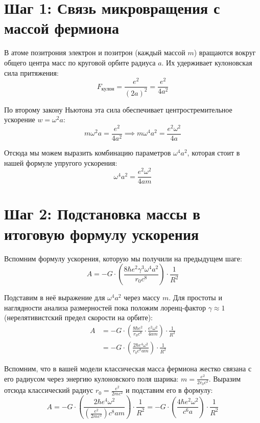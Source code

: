 \documentclass[12pt,a4paper]{article}
\begin{document}
\section*{Шаг 1: Связь микровращения с массой фермиона}

В атоме позитрония электрон и позитрон (каждый массой $m$) вращаются вокруг общего центра масс по круговой орбите радиуса $a$. Их удерживает кулоновская сила притяжения:
\begin{equation}
F_{кулон} = \frac{e^2}{(2a)^2} = \frac{e^2}{4a^2}
\end{equation}

По второму закону Ньютона эта сила обеспечивает центростремительное ускорение $w = \omega^2 a$:
\begin{equation}
m \omega^2 a = \frac{e^2}{4a^2} \implies m \omega^4 a^2 = \frac{e^2 \omega^2}{4a}
\end{equation}

Отсюда мы можем выразить комбинацию параметров $\omega^4 a^2$, которая стоит в нашей формуле упругого ускорения:
\begin{equation}
\omega^4 a^2 = \frac{e^2 \omega^2}{4a m}
\end{equation}

\section*{Шаг 2: Подстановка массы в итоговую формулу ускорения}

Вспомним формулу ускорения, которую мы получили на предыдущем шаге:
\begin{equation}
A = - G \cdot \left( \frac{8 \hbar e^2 \gamma^3 \omega^4 a^2}{r_0 c^8} \right) \cdot \frac{1}{R^2}
\end{equation}

Подставим в неё выражение для $\omega^4 a^2$ через массу $m$. Для простоты и наглядности анализа размерностей пока положим лоренц-фактор $\gamma \approx 1$ (нерелятивистский предел скорости на орбите):
\begin{align}
A &= - G \cdot \left( \frac{8 \hbar e^2}{r_0 c^8} \cdot \frac{e^2 \omega^2}{4a m} \right) \cdot \frac{1}{R^2} \\
&= - G \cdot \left( \frac{2 \hbar e^4 \omega^2}{r_0 c^8 a m} \right) \cdot \frac{1}{R^2}
\end{align}

Вспомним, что в вашей модели классическая масса фермиона жестко связана с его радиусом через энергию кулоновского поля шарика: $m = \frac{e^2}{2 r_0 c^2}$. Выразим отсюда классический радиус $r_0 = \frac{e^2}{2 m c^2}$ и подставим его в формулу:
\begin{equation}
A = - G \cdot \left( \frac{2 \hbar e^4 \omega^2}{\left(\frac{e^2}{2 m c^2}\right) c^8 a m} \right) \cdot \frac{1}{R^2} = - G \cdot \left( \frac{4 \hbar e^2 \omega^2}{c^6 a} \right) \cdot \frac{1}{R^2}
\end{equation}
\end{document}
